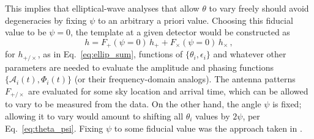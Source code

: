 \documentclass[aps,prd,twocolumn,superscriptaddress,preprintnumbers,floatfix,nofootinbib]{revtex4-2}
\begin{document}
This implies that elliptical-wave analyses that allow $\theta$ to vary freely should avoid degeneracies by fixing $\psi$ to an arbitrary a priori value.
Choosing this fiducial value to be $\psi=0$, the template at a given detector would be constructed as
\begin{equation}
h = F_+(\psi=0)\, h_+ + F_\times(\psi=0)\,  h_\times \, ,
\end{equation}
for $h_{+/\times}$, as in Eq.~\eqref{eq:ellip_sum}, functions of $\{\theta_i, \epsilon_i\}$ and whatever other parameters are needed to evaluate the amplitude and phasing functions $\{\mathcal{A}_i(t), \Phi_i(t)\}$ (or their frequency-domain analogs).
The antenna patterns $F_{+/\times}$ are evaluated for some sky location and arrival time, which can be allowed to vary to be measured from the data.
On the other hand, the angle $\psi$ is fixed; allowing it to vary would amount to shifting all $\theta_i$ values by $2\psi$, per Eq.~\eqref{eq:theta_psi}.
Fixing $\psi$ to some fiducial value was the approach taken in \cite{Isi:2017equ,Chatziioannou:2021mij,Isi:2021iql}.




\end{document}
